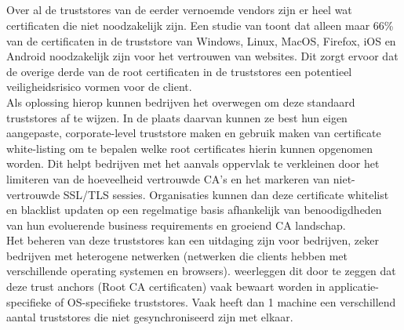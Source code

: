 \subsection{}
\label{subsec:Best_practices_voor_bedrijven_hun_truststores}

Over al de truststores van de eerder vernoemde vendors zijn er heel wat certificaten die niet noodzakelijk zijn. Een studie van \textcite{PerlHenning} toont dat alleen maar 66\% van de certificaten in de truststore van Windows, Linux, MacOS, Firefox, iOS en Android noodzakelijk zijn voor het vertrouwen van websites.
Dit zorgt ervoor dat de overige derde van de root certificaten in de truststores een potentieel veiligheidsrisico vormen voor de client. \\

Als oplossing hierop kunnen bedrijven het overwegen om deze standaard truststores af te wijzen. In de plaats daarvan kunnen ze best hun eigen aangepaste, corporate-level truststore maken en gebruik maken van certificate white-listing om te bepalen welke root certificates hierin kunnen opgenomen worden.
Dit helpt bedrijven met het aanvals oppervlak te verkleinen door het limiteren van de hoeveelheid vertrouwde CA's en het markeren van niet-vertrouwde SSL/TLS sessies.
Organisaties kunnen dan deze certificate whitelist en blacklist updaten op een regelmatige basis afhankelijk van benoodigdheden van hun evoluerende business requirements en groeiend CA landschap. \autocite{Venafi} \\

Het beheren van deze truststores kan een uitdaging zijn voor bedrijven, zeker bedrijven met heterogene netwerken (netwerken die clients hebben met verschillende operating systemen en browsers).
\textcite{rfc6024} weerleggen dit door te zeggen dat deze trust anchors (Root CA certificaten) vaak bewaart worden in applicatie-specifieke of OS-specifieke truststores.
Vaak heeft dan 1 machine een verschillend aantal truststores die niet gesynchroniseerd zijn met elkaar.


\pagebreak

\section{}%
\label{sec:Verschillende truststores}

